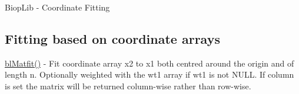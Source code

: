 Biop\-Lib -\/ Coordinate Fitting

\subsection*{Fitting based on coordinate arrays }


\begin{DoxyItemize}
\item \hyperlink{fit_8c_a04b6a274d146e9a4b4e3ee014b90d514}{bl\-Matfit()} -\/ Fit coordinate array x2 to x1 both centred around the origin and of length n. Optionally weighted with the wt1 array if wt1 is not N\-U\-L\-L. If column is set the matrix will be returned column-\/wise rather than row-\/wise. 
\end{DoxyItemize}